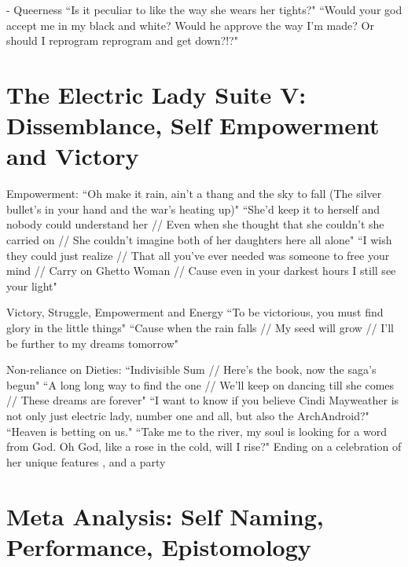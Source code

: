 \documentclass[a4paper, 11pt]{article} %
\begin{document}
- Queerness
``Is it peculiar to like the way she wears her tights?"\cite{queen}
``Would your god accept me in my black and white? Would he approve the way I'm made? Or should I reprogram reprogram and get down?!?"\cite{queen}


\section*{The Electric Lady Suite V: Dissemblance, Self Empowerment and Victory}

Empowerment: 
``Oh make it rain, ain't a thang and the sky to fall (The silver bullet's in your hand and the war's heating up)" \cite{manymoons}
``She'd keep it to herself and nobody could understand her // Even when she thought that she couldn't she carried on // She couldn't imagine both of her daughters here all alone"\cite{ghettowoman}
``I wish they could just realize // That all you've ever needed was someone to free your mind // Carry on Ghetto Woman // Cause even in your darkest hours I still see your light" \cite{ghettowoman}

Victory, Struggle, Empowerment and Energy
``To be victorious, you must find glory in the little things"\cite{victory}
``Cause when the rain falls // My seed will grow // I'll be further to my dreams tomorrow"\cite{victory}


Non-reliance on Dieties:
``Indivisible Sum // Here's the book, now the saga's begun"\cite{fiveseveneighttwoone}
``A long long way to find the one // We'll keep on dancing till she comes // These dreams are forever"\cite{danceordie}
``I want to know if you believe Cindi Mayweather is not only just electric lady, number one and all, but also the ArchAndroid?"\cite{favoritefugitive}
``Heaven is betting on us."\cite{primetime}
``Take me to the river, my soul is looking for a word from God. Oh God, like a rose in the cold, will I rise?"\cite{sallyride}
Ending on a celebration of her unique features \cite{dandridgeeyes}, and a party\cite{whatanexperience}


\section*{Meta Analysis: Self Naming, Performance, Epistomology}
\end{document}
